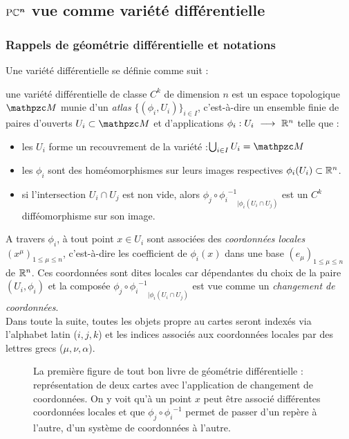 \subsection{$\boldsymbol{\text{\normalfont P}\mathbb{C}^{n}}$ vue comme variété différentielle} \label{subsec:construc_PC^n}

\subsubsection{Rappels de géométrie différentielle et notations}\label{subsec:rappel2geo_diff}

Une variété différentielle se définie comme suit :
\begin{definition} \label{defvarietoche}
	une variété différentielle de classe $C^k$ de dimension $n$ est un espace topologique
	$\manu$ munie d'un \emph{atlas} $\big\{ (\phi_i, U_i) \big\}_{i\in I}$, c'est-à-dire un ensemble finie de paires d'ouverts $U_i\subset \manu$ et d'applications $\phi_i :U_i\ \longrightarrow\ \mathbb{R}^n$ telle que :
	\begin{itemize}
		
		\item les $U_i$ forme un recouvrement de la variété :\qquad $\bigcup_{i\in I} U_i = \manu$
		
		\item les $\phi_i$ sont des homéomorphismes sur leurs images respectives $\phi_i(U_i)\subset\mathbb{R}^n$.
		
		\item si l'intersection $U_i \cap U_j$ est non vide, alors ${\phi_j \circ {\phi_i}^{-1}}_{| {\phi_i}(U_i\cap U_j)}$ est un $C^k$ difféomorphisme sur son image.
		
	\end{itemize}
	A travers $\phi_i$, à tout point $x\in U_i$ sont associées des \emph{coordonnées locales} $(x^\mu)_{1\leq \mu\leq n}$, c'est-à-dire les coefficient de $\phi_i(x)$ dans une base $(e_\mu)_{1\leq \mu\leq n}$ de $\mathbb{R}^n$. Ces coordonnées sont dites locales car dépendantes du choix de la paire $(U_i,\phi_i)$ et la composée ${\phi_j \circ {\phi_i}^{-1}}_{| {\phi_i}(U_i\cap U_j)}$ est vue comme un \emph{changement de coordonnées}.\\
	Dans toute la suite, toutes les objets propre au cartes seront indexés via l'alphabet latin ($i,j,k$) et les indices associés aux coordonnées locales par des lettres grecs ($\mu,\nu,\alpha$).
\end{definition}

\begin{figure}[h]
	
	\caption[\DONE La première figure de tout bon livre de géométrie différentielle]{La première figure de tout bon livre de géométrie différentielle : représentation de deux cartes avec l'application de changement de coordonnées. On y voit qu'à un point $x$ peut être associé différentes coordonnées locales et que $\phi_j \circ {\phi_i}^{-1}$ permet de passer d'un repère à l'autre, \ie d'un système de coordonnées à l'autre.}
\end{figure}

